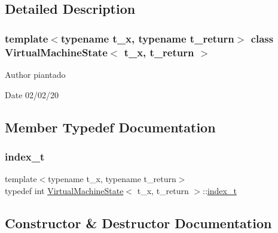 \subsection{Detailed Description}
\subsubsection*{template$<$typename t\+\_\+x, typename t\+\_\+return$>$\newline
class Virtual\+Machine\+State$<$ t\+\_\+x, t\+\_\+return $>$}

\begin{DoxyAuthor}{Author}
piantado 
\end{DoxyAuthor}
\begin{DoxyDate}{Date}
02/02/20 
\end{DoxyDate}


\subsection{Member Typedef Documentation}
\mbox{\label{class_virtual_machine_state_ad082a1996e3cce1eb04bc788c24a3214}} 
\subsubsection{\texorpdfstring{index\+\_\+t}{index\_t}}
{\footnotesize\ttfamily template$<$typename t\+\_\+x, typename t\+\_\+return$>$ \\
typedef int \hyperlink{class_virtual_machine_state}{Virtual\+Machine\+State}$<$ t\+\_\+x, t\+\_\+return $>$\+::\hyperlink{class_virtual_machine_state_ad082a1996e3cce1eb04bc788c24a3214}{index\+\_\+t}}



\subsection{Constructor \& Destructor Documentation}
\mbox{\label{class_virtual_machine_state_a650ed7d917a116595deb00e7136c0824}} 
